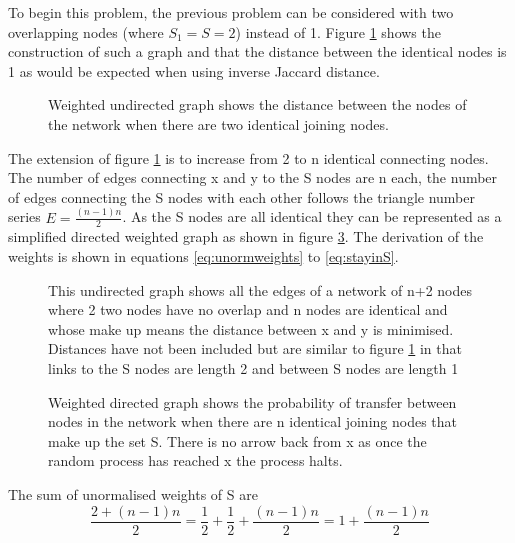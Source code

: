 To begin this problem, the previous problem can be considered with two overlapping nodes (where $S_1=S=2$) instead of 1. Figure \ref{net:4nodes} shows the construction of such a graph and that the distance between the identical nodes is 1 as would be expected when using inverse Jaccard distance.


\begin{figure}[ht]
    \centering
    
    \caption[Four node graph]{Weighted undirected graph shows the distance between the nodes of the network when there are two identical joining nodes.}
    \label{net:4nodes}
\end{figure}



The extension of figure \ref{net:4nodes} is to increase from 2 to n identical connecting nodes. The number of edges connecting x and y to the S nodes are n each, the number of edges connecting the S nodes with each other follows the triangle number series $E=\frac{(n-1)n}{2}$. As the S nodes are all identical they can be represented as a simplified directed weighted graph as shown in figure \ref{net:Nnodesweighted}. The derivation of the weights is shown in equations \ref{eq:unormweights} to \ref{eq:stayinS}.

\begin{figure}[ht]
    \centering
    
    \caption[N node unweighted Graph]{This undirected graph shows all the edges of a network of n+2 nodes where 2 two nodes have no overlap and n nodes are identical and whose make up means the distance between x and y is minimised. Distances have not been included but are similar to figure \ref{net:4nodes} in that links to the S nodes are length 2 and between S nodes are length 1}
    \label{net:Nnodes}
\end{figure}


\begin{figure}[ht]
    \centering
    
    \caption[N node transfer probability]{Weighted directed graph shows the probability of transfer between nodes in the network when there are n identical joining nodes that make up the set S. There is no arrow back from x as once the random process has reached x the process halts.}
    \label{net:Nnodesweighted}
\end{figure}

The sum of unormalised weights of S are 
\begin{equation}
    \frac{2+(n-1)n}{2}= \frac{1}{2}+\frac{1}{2}+\frac{(n-1)n}{2}= 1+\frac{(n-1)n}{2}
    \label{eq:unormweights}
\end{equation}


